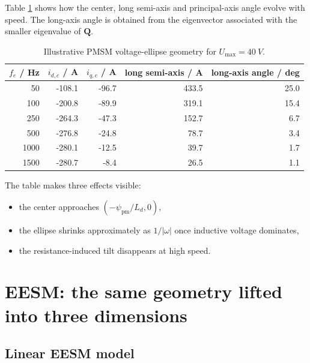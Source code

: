 \documentclass[11pt,a4paper]{article}
\newcommand{\Ld}{L_d}
\newcommand{\psipm}{\psi_{\mathrm{pm}}}
\newcommand{\Umax}{U_{\max}}
\newcommand{\mat}[1]{\bm{#1}}
\begin{document}
Table \ref{tab:psm-numeric} shows how the center, long semi-axis and principal-axis angle evolve with speed. The long-axis angle is obtained from the eigenvector associated with the smaller eigenvalue of $\mat Q$.

\begin{table}[htbp]
\centering
\caption{Illustrative PMSM voltage-ellipse geometry for $\Umax=\SI{40}{V}$.}
\label{tab:psm-numeric}
\begin{tabular}{rrrrr}
\toprule
$f_e$ / Hz & $i_{d,c}$ / A & $i_{q,c}$ / A & long semi-axis / A & long-axis angle / deg\\
\midrule
50   & -108.1 & -96.7 & 433.5 & 25.0\\
100  & -200.8 & -89.9 & 319.1 & 15.4\\
250  & -264.3 & -47.3 & 152.7 & 6.7\\
500  & -276.8 & -24.8 & 78.7  & 3.4\\
1000 & -280.1 & -12.5 & 39.7  & 1.7\\
1500 & -280.7 & -8.4  & 26.5  & 1.1\\
\bottomrule
\end{tabular}
\end{table}

The table makes three effects visible:

\begin{itemize}
  \item the center approaches $(-\psipm/\Ld,0)$,
  \item the ellipse shrinks approximately as $1/|\omega|$ once inductive voltage dominates,
  \item the resistance-induced tilt disappears at high speed.
\end{itemize}

\section{EESM: the same geometry lifted into three dimensions}

\subsection{Linear EESM model}
\end{document}
